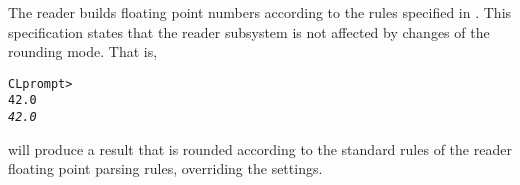 \documentclass[../Rounding-Modes.tex]{subfiles}
\begin{document}
The \CL{} reader builds floating point numbers according to the rules
specified in \cite{1994:ANSICL}.  This specification states that the
\CL{} reader subsystem is not affected by changes of the rounding
mode.  That is,
\begin{alltt}
CL prompt> 
42.0
\textit{42.0}
\end{alltt}
will produce a  result that is rounded according to the
standard rules of the \CL{} reader floating point parsing
rules, overriding the  settings.

\end{document}
